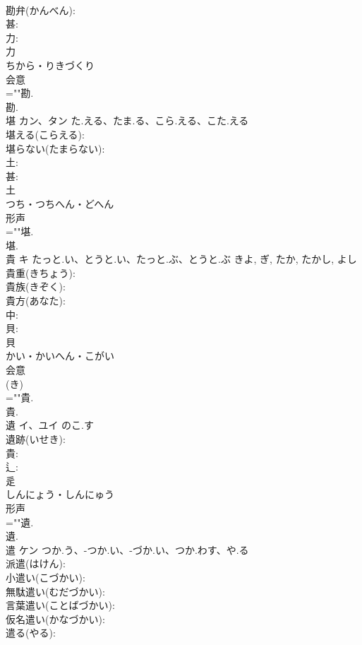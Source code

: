 \documentclass[8pt]{extreport}
\begin{document}
\begin{CJK}{UTF8}{min}
\\	勘弁(かんべん): 
\\	甚: 
\\	力: 
\\	力	
\\	ちから・りきづくり	
\\	会意 
\\	=""勘.
\\	勘.
\\	堪	カン、タン	た.える、たま.る、こら.える、こた.える		
\\	堪える(こらえる): 
\\	堪らない(たまらない): 
\\	土: 
\\	甚: 
\\	土	
\\	つち・つちへん・どへん	
\\	形声 
\\	=""堪.
\\	堪.
\\	貴	キ	たっと.い、とうと.い、たっと.ぶ、とうと.ぶ	きよ, ぎ, たか, たかし, よし	
\\	貴重(きちょう): 
\\	貴族(きぞく): 
\\	貴方(あなた): 
\\	中: 
\\	貝: 
\\	貝	
\\	かい・かいへん・こがい	
\\	会意 
\\	(き) 
\\	=""貴.
\\	貴.
\\	遺	イ、ユイ	のこ.す		
\\	遺跡(いせき): 
\\	貴: 
\\	辶: 
\\	辵	
\\	しんにょう・しんにゅう	
\\	形声 
\\	=""遺.
\\	遺.
\\	遣	ケン	つか.う、-つか.い、-づか.い、つか.わす、や.る		
\\	派遣(はけん): 
\\	小遣い(こづかい): 
\\	無駄遣い(むだづかい): 
\\	言葉遣い(ことばづかい): 
\\	仮名遣い(かなづかい): 
\\	遣る(やる): 

\end{CJK}
\end{document}
